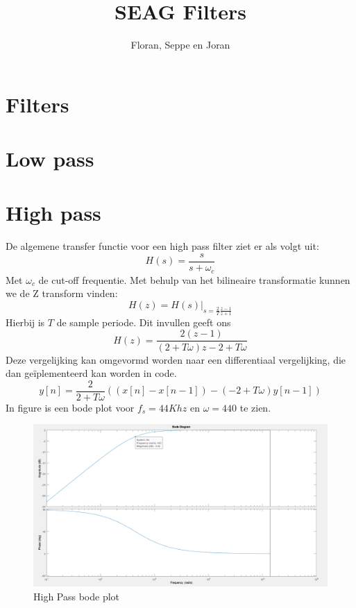 \documentclass[11pt]{article} %
\title{SEAG Filters}
\author{Floran, Seppe en Joran}
\date{}
\begin{document}
\maketitle

\section{Filters}



\section{Low pass}

\section{High pass}


De algemene transfer functie voor een high pass filter ziet er als volgt uit: 
\begin{equation}
H(s) = \frac{s}{s+\omega_c}
\end{equation}
Met $\omega_c$ de cut-off frequentie.
Met behulp van het bilineaire transformatie kunnen we de Z transform vinden:
\begin{equation}
H(z) = H(s)|_{s=\frac{2}{T}\frac{z-1}{z+1}}
\end{equation}
Hierbij is $T$ de sample periode. Dit invullen geeft ons
\begin{equation}
H(z)=\frac{2(z-1)}{(2+T\omega)z-2+T\omega}
\end{equation}
Deze vergelijking kan omgevormd worden naar een differentiaal vergelijking, die dan geïplementeerd kan worden in code.
\begin{equation}
y[n] = \frac{2}{2+T\omega}((x[n]-x[n-1]) - (-2+T\omega)y[n-1] )
\end{equation}
In figure \cite{High Pass bode plot} is een bode plot voor $f_s = 44Khz$ en $\omega = 440$ te zien.
\begin{figure}
	\centering
	\includegraphics[scale=0.3]{HighPassBodeplot.png}
	\caption{High Pass bode plot}
	\label{Fig:High Pass bode plot}
\end{figure}
\end{document}
